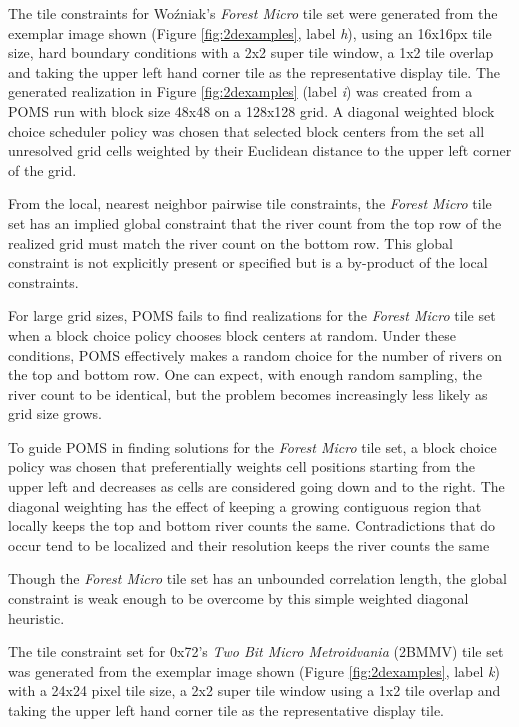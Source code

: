 The tile constraints for Wo\'zniak's \textit{Forest Micro} tile set were generated from the exemplar image shown (Figure \ref{fig:2dexamples}, label \textit{h}), using
an 16x16px tile size, hard boundary conditions with a 2x2 super tile window, a 1x2 tile overlap and taking the upper left hand corner tile as the representative
display tile.
The generated realization in Figure \ref{fig:2dexamples} (label \textit{i}) was created from a POMS run with block size 48x48 on a 128x128 grid.
A diagonal weighted block choice scheduler policy was chosen that selected block centers from the set all unresolved grid cells weighted by their Euclidean distance
to the upper left corner of the grid.

From the local, nearest neighbor pairwise tile constraints,
the \textit{Forest Micro} tile set has an implied global constraint that the river count from the top row of the realized
grid must match the river count on the bottom row.
This global constraint is not explicitly present or specified but is a by-product of the local constraints.

For large grid sizes, POMS fails to find realizations for the \textit{Forest Micro} tile set when a block
choice policy chooses block centers at random.
Under these conditions, POMS effectively makes a random choice for the number of rivers on the top and bottom row.
One can expect, with enough random sampling, the river count to be identical, but the problem
becomes increasingly less likely as grid size grows.

To guide POMS in finding solutions for the \textit{Forest Micro} tile set, a
block choice policy was chosen that preferentially weights cell positions starting from the upper left and decreases as
cells are considered going down and to the right.
The diagonal weighting has the effect of keeping a growing contiguous region that locally keeps the top and bottom
river counts the same.
Contradictions that do occur tend to be localized and their resolution keeps the river counts the same

Though the \textit{Forest Micro} tile set has an unbounded correlation length, the global constraint is weak enough
to be overcome by this simple weighted diagonal heuristic.

The tile constraint set for 0x72's \textit{Two Bit Micro Metroidvania} (2BMMV) tile set was
generated from the exemplar image shown (Figure \ref{fig:2dexamples}, label \textit{k}) with a 24x24 pixel tile size, a 2x2 super tile window
using a 1x2 tile overlap and taking the upper left hand corner tile as the representative display tile.

